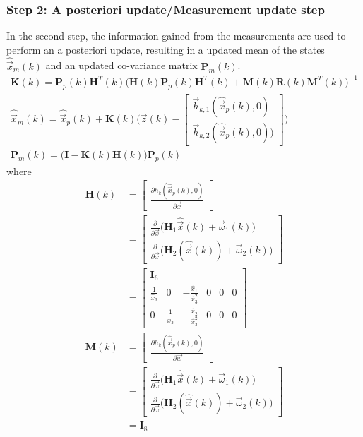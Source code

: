 \subsubsection{Step 2: A posteriori update/Measurement update step}
In the second step, the information gained from the measurements are used to perform an a posteriori update, resulting in a updated mean of the states $\hat{\vec x}_m(k)$ and an updated co-variance matrix $\textbf{P}_m(k)$.
\begin{align}
	\textbf{K}(k) = \textbf{P}_p(k) \textbf{H}^T(k) \Big( \textbf{H}(k) \textbf{P}_p(k) \textbf{H}^T(k) + \textbf{M}(k) \textbf{R}(k) \textbf{M}^T(k)\Big)^{-1} \label{eq:ekf_s2}\\
	\hat{\vec x}_m(k) = \hat{\vec x}_p(k) + \textbf{K}(k) \Big( \vec z(k) - \begin{bmatrix}
	\vec h_{k,1}(\hat{\vec x}_p(k), 0)\\
	\vec h_{k,2}(\hat{\vec x}_p(k), 0))
	\end{bmatrix} \Big)\\
	\textbf{P}_m(k) = \big( \textbf{I} - \textbf{K}(k)\textbf{H}(k)\big) \textbf{P}_p(k)
\end{align}
where
\begin{align}
  \textbf{H}(k) &= \begin{bmatrix}
    \frac{\partial h_k(\hat{\vec x}_p(k), 0)}{\partial \vec x}
  \end{bmatrix}\\
  &= \begin{bmatrix}
		\frac{\partial}{\partial \vec x} \big( \textbf{H}_1 \hat{\vec x}(k) + \vec \omega_1(k) \big)\\
		\frac{\partial}{\partial \vec x} \big( \textbf{H}_2(\hat{\vec x}(k)) + \vec \omega_2(k) \big)
	\end{bmatrix}\\
	&= \begin{bmatrix}
		\textbf{I}_6\\
		\frac{1}{\hat{x}_3} & 0 & -\frac{\hat{x}_1}{\hat{x}^2_3} & 0 & 0 & 0\\
		0 & \frac{1}{\hat{x}_3} & -\frac{\hat{x}_2}{\hat{x}^2_3} & 0 & 0 & 0
	\end{bmatrix}\\
  \textbf{M}(k) & = \begin{bmatrix}
    \frac{\partial h_k(\hat{\vec x}_p(k), 0)}{\partial \vec w}
  \end{bmatrix}\\
  &= \begin{bmatrix}
		\frac{\partial}{\partial \vec \omega} \big( \textbf{H}_1 \hat{\vec x}(k) + \vec \omega_1(k) \big)\\
		\frac{\partial}{\partial \vec \omega} \big( \textbf{H}_2(\hat{\vec x}(k)) + \vec \omega_2(k) \big)
	\end{bmatrix}\\
	&= \textbf{I}_8
\end{align}
